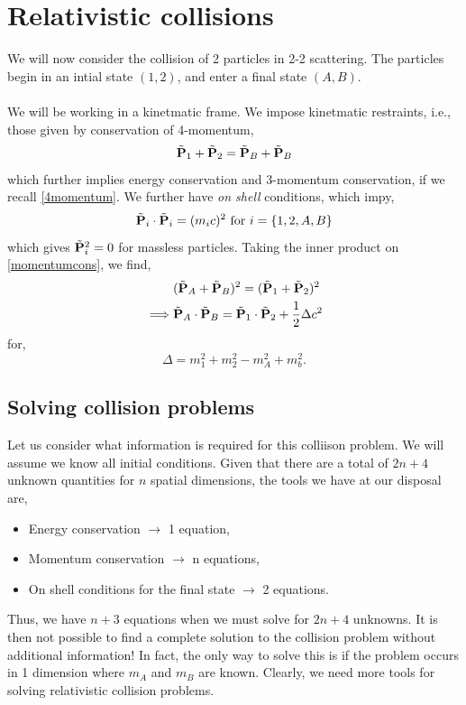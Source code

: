 \documentclass{book}
\begin{document}
\section{Relativistic collisions}
We will now consider the collision of 2 particles in 2-2 scattering. The particles begin in an intial state $(1,2)$, and enter a final state $(A,B)$.
\\\\
We will be working in a kinetmatic frame. We impose kinetmatic restraints, i.e., those given by conservation of 4-momentum,
\begin{equation}
	\tilde{\vb{\vb{P}}}_1 + \tilde{\vb{P}}_2 = \tilde{\vb{P}}_B + \tilde{\vb{P}}_B \label{momentumcons}
\end{equation}
which further implies energy conservation and 3-momentum conservation, if we recall \eqref{4momentum}. We further have \textit{on shell} conditions, which impy,
\begin{equation}
	\tilde{\vb{P}}_i \cdot \tilde{\vb{P}}_i = (m_ic)^2 \text{ for } i = \left\{1,2,A,B\right\}
\end{equation}
which gives $\tilde{\vb{P}}_i^2 = 0$ for massless particles. Taking the inner product on \eqref{momentumcons}, we find,
\begin{equation}
	\begin{split}
		&(\tilde{\vb{P}}_A + \tilde{\vb{P}}_B)^2 = (\tilde{\vb{P}}_1 + \tilde{\vb{P}}_2)^2 \\
		\implies & \tilde{\vb{P}}_A \cdot \tilde{\vb{P}}_B = \tilde{\vb{P}}_1 \cdot \tilde{\vb{P}}_2 + \frac{1}{2}\Delta c^2
	\end{split}
\end{equation}
for,
\begin{equation}
	\Delta = m_1^2 + m_2^2 -m_A^2 + m_b^2.
\end{equation}
\subsection{Solving collision problems}
Let us consider what information is required for this colliison problem. We will assume we know all initial conditions. Given that there are a total of $2n+4$ unknown quantities for $n$ spatial dimensions, the tools we have at our disposal are,
\begin{itemize}
	\item Energy conservation $\to$ 1 equation,
	\item Momentum conservation $\to$ n equations,
	\item On shell conditions for the final state $\to$ 2 equations.
\end{itemize}
Thus, we have $n+3$ equations when we must solve for $2n+4$ unknowns. It is then not possible to find a complete solution to the collision problem without additional information! In fact, the only way to solve this is if the problem occurs in 1 dimension where $m_A$ and $m_B$ are known. Clearly, we need more tools for solving relativistic collision problems.
\end{document}

